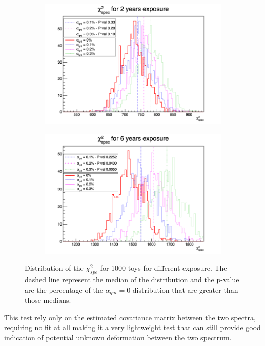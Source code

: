 \documentclass[../main.tex]{subfiles}
\begin{document}
\begin{figure}[th]
  \begin{subfigure}[t]{0.48\linewidth}
    \includegraphics[width=\linewidth]{images/joint_fit/stat_tests/chi2_spec_2y.png}
  \end{subfigure}
  \begin{subfigure}[t]{0.48\linewidth}
    \includegraphics[width=\linewidth]{images/joint_fit/stat_tests/chi2_spec_6y.png}
  \end{subfigure}
  \caption{Distribution of the $\chi^2_{spe}$ for 1000 toys for different exposure. The dashed line represent the median of the distribution and the p-value are the percentage of the $\alpha_{qnl} = 0$ distribution that are greater than those medians.}
  \label{fig:joint_fit:chi2_spec}
\end{figure}

This test rely only on the estimated covariance matrix between the two spectra, requiring no fit at all making it a very lightweight test that can still provide good indication of potential unknown deformation between the two spectrum.
\end{document}
